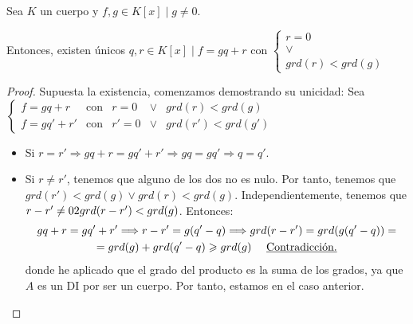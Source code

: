 \begin{teo}
    \label{teo:DividirPolinomios}
    Sea $K$ un cuerpo y $f,g \in K[x] \mid g\neq 0$.
    
    Entonces, existen únicos $q,r \in K[x] \mid f=gq+r$ con $\left\{\begin{array}{c}
            r=0 \\ \lor \\ grd(r)<grd(g)
        \end{array}\right.$
\end{teo}
\begin{proof}
    Supuesta la existencia, comenzamos demostrando su unicidad:\newline
    Sea $\left\{\begin{array}{lllll}
        f=gq+r & \text{con} & r=0 & \lor & grd(r)<grd(g) \\
        f=gq'+r' & \text{con} & r'=0 & \lor & grd(r')<grd(g')
    \end{array}\right.$

    \begin{itemize}
        \item Si $r=r' \Longrightarrow gq+r = gq'+r' \Longrightarrow gq = gq' \Longrightarrow q=q'$.

        \item Si $r \neq r'$, tenemos que alguno de los dos no es nulo. Por tanto, tenemos que $grd(r')<grd(g) \lor grd(r)<grd(g)$. Independientemente, tenemos que $ r-r' \neq 0 \y grd(r-r') < grd(g)$. Entonces:
        \begin{multline*}
            gq+r = gq'+r' \Longrightarrow r-r' = g(q'-q) \Longrightarrow grd(r-r') = grd(g(q'-q)) =\\
            =grd(g)+grd(q'-q) \geq grd(g) \quad \mbox{ \underline{Contradicción.}}
        \end{multline*}
        donde he aplicado que el grado del producto es la suma de los grados, ya que $A$ es un DI por ser un cuerpo. Por tanto, estamos en el caso anterior.
    \end{itemize}
    

\end{proof}

